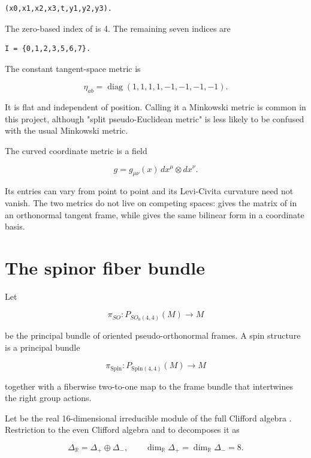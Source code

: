 \documentclass[11pt]{article}
\begin{document}
\begin{Verbatim}[fontsize=\small]
(x0,x1,x2,x3,t,y1,y2,y3).
\end{Verbatim}

The zero-based index of \texttt{} is 4. The remaining seven indices are

\begin{Verbatim}[fontsize=\small]
I = {0,1,2,3,5,6,7}.
\end{Verbatim}

The constant tangent-space metric is

\[
\eta_{ab}=\operatorname{diag}(1,1,1,1,-1,-1,-1,-1).
\]

It is flat and independent of position. Calling it a \texttt{} Minkowski metric is common in this project, although "split pseudo-Euclidean metric" is less likely to be confused with the usual \texttt{} Minkowski metric.

The curved coordinate metric is a field

\[
g=g_{\mu\nu}(x)\,dx^\mu\otimes dx^\nu.
\]

Its entries can vary from point to point and its Levi-Civita curvature need not vanish. The two metrics do not live on competing spaces: \texttt{} gives the matrix of \texttt{} in an orthonormal tangent frame, while \texttt{} gives the same bilinear form in a coordinate basis.

\section{The spinor fiber bundle}

Let

\[
\pi_{SO}:P_{SO_0(4,4)}(M)\longrightarrow M
\]

be the principal bundle of oriented pseudo-orthonormal frames. A spin structure is a principal bundle

\[
\pi_{\mathrm{Spin}}:P_{\mathrm{Spin}(4,4)}(M)\longrightarrow M
\]

together with a fiberwise two-to-one map to the frame bundle that intertwines the right group actions.

Let \texttt{} be the real 16-dimensional irreducible module of the full Clifford algebra \texttt{}. Restriction to the even Clifford algebra and to \texttt{} decomposes it as

\[
\Delta_{\mathbb R}=\Delta_+\oplus\Delta_-,
\qquad \dim_{\mathbb R}\Delta_+=\dim_{\mathbb R}\Delta_-=8.
\]
\end{document}
